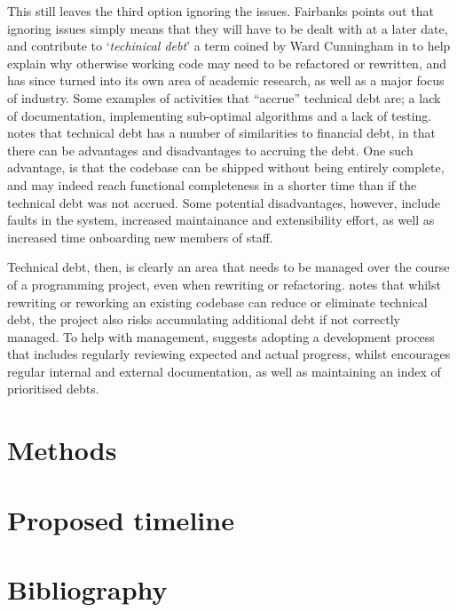 \documentclass{article}
\begin{document}
This still leaves the third option \textendash{} ignoring the issues. Fairbanks points out that
ignoring issues simply means that they will have to be dealt with at a later date, and contribute to
`\textit{techinical debt}' \textendash{} a term coined by Ward Cunningham in \cite{Cunningham} to
help explain why otherwise working code may need to be refactored or rewritten, and has since turned
into its own area of academic research, as well as a major focus of industry. Some examples of
activities that ``accrue'' technical debt are; a lack of documentation, implementing sub-optimal
algorithms and a lack of testing. \cite{Allman} notes that technical debt has a number of
similarities to financial debt, in that there can be advantages and disadvantages to accruing the
debt. One such advantage, is that the codebase can be shipped without being entirely complete, and
may indeed reach functional completeness in a shorter time than if the technical debt was not
accrued. Some potential disadvantages, however, include faults in the system, increased maintainance
and extensibility effort, as well as increased time onboarding new members of staff.

Technical debt, then, is clearly an area that needs to be managed over the course of a programming
project, even when rewriting or refactoring. \cite{Fairley} notes that whilst rewriting or reworking
an existing codebase can reduce or eliminate technical debt, the project also risks accumulating
additional debt if not correctly managed. To help with management, \cite{Fairley} suggests adopting
a development process that includes regularly reviewing expected and actual progress, whilst
\cite{Allman} encourages regular internal and external documentation, as well as maintaining an
index of prioritised debts.

\section{Methods}
\section{Proposed timeline}
\section{Bibliography}
\printbibliography{}
\end{document}

